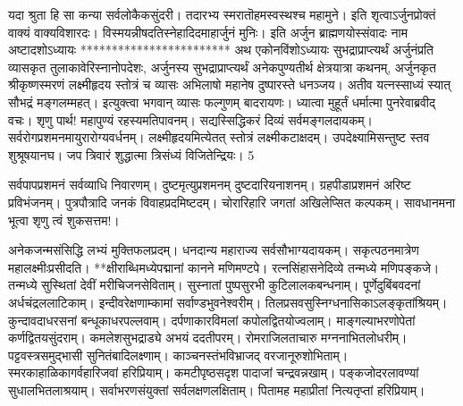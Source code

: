यदा श्रुता हि सा कन्या सर्वलोकैकसुंदरी।
तदारभ्य स्मरातॊहमस्वस्थश्च महामुने।
इति शृत्वाऽर्जुनप्रोक्तं वाक्यं वाक्यविशारदः।
विस्मयन्नीषदतिस्नेहादिदमाहार्जुनं मुनिः।
इति अर्जुन ब्राह्मणयोस्संवादः नाम
अष्टादशोऽध्यायः
************************
अथ एकोनविंशोऽध्यायः सुभद्राप्राप्त्यर्थं अर्जुनंप्रति व्यासकृत तुलाकावेरिस्नानोपदेशः, अर्जुनस्य सुभद्राप्राप्त्यर्थं अनेकपुण्यतीर्थ क्षेत्रयात्रा कथनम्, अर्जुनकृत
श्रीकृष्णस्मरणं लक्ष्मीहृदय स्तोत्रं च
व्यासः
अभिलाषो महानेष दुष्पारस्ते धनञ्जय।
अतीव यत्नस्साध्यं स्यात् सौभद्रं मङ्गलम्महत्।
इत्युक्त्वा भगवान् व्यासः फल्गुणम् बादरायणः।
ध्यात्वा मुहूर्तं धर्मात्मा पुनरेवाब्रवीद् वचः।
शृणु पार्थ! महापुण्यं रहस्यमतिपावनम्।
सद्यस्सिद्धिकरं दिव्यं सर्वमङ्गलदायकम्।
सर्वरोगप्रशमनमायुरारोग्यवर्धनम्।
लक्ष्मीहृदयमित्येतत् स्तोत्रं लक्ष्मीकटाक्षदम्।
उपदेक्ष्यामिसन्तुष्ट स्तव शुश्रूषयानघ।
जप त्रिवारं शुद्धात्मा त्रिसंध्यं विजितेन्द्रियः।
5

सर्वपापप्रशमनं सर्वव्याधि निवारणम्।
दुष्टमृत्युप्रशमनम् दुष्टदारियनाशनम्।
ग्रहपीडाप्रशमनं अरिष्ट प्रविभंजनम्।
पुत्रपौत्रादि जनकं विवाहप्रदमिष्टदम्।
चोरारिहारि जगतां अखिलेप्सित कल्पकम्।
सावधानमना भूत्वा शृणु त्वं शुकसत्तम!।

अनेकजन्मसंसिद्धि लभ्यं मुक्तिफलप्रदम्।
धनदान्य महाराज्य सर्वसौभाग्यदायकम्।
सकृत्पठनमात्रेण महालक्ष्मीःप्रसीदति।
**क्षीराब्धिमध्येपद्मानां कानने मणिमण्टपे।
रत्नसिंहासनेदिव्ये तन्मध्ये मणिपङ्कजे।
तन्मध्ये सुस्थितां देवीं मरीचिजनसेविताम्।
सुस्नातां पुष्पसुरभी कुटिलालकबन्धनाम्।
पूर्णेदुबिंबवदनां अर्धचंद्रललाटिकाम्।
इन्दीवरेक्षणाम्कामां सर्वाण्डभुवनेश्वरीम्।
तिलप्रसवसुस्निग्धनासिकाऽलङ्कृतांश्रियम्।
कुन्दावदाधरसनां बन्धूकाधरपल्लवाम्।
दर्पणाकारविमलां कपोलद्वितयोज्वलाम्।
माङ्गल्याभरणोपेतां कर्णद्वितयसुंदराम्।
कमलेशसुभद्राड्ये अभयं ददतीपरम्।
रोमराजिलताचारु मग्ननाभितलोधरीम्।
पट्टवस्त्रसमुद्भासी सुनितंबादिलक्ष्णाम्।
काञ्चनस्तंभविभ्राजद् वरजानूरुशोभिताम्।
स्मरकाहाळिकागर्वहारिजवां हरिप्रियाम्।
कमटीपृष्ठसदृश पादाजां चन्द्रवन्नखाम्।
पङ्कजोदरलावण्यां सुधालभितलाश्रयाम्।
सर्वाभरणसंयुक्तां सर्वलक्षणलक्षिताम्।
पितामह महाप्रीतां नित्यतृप्तां हरिप्रियाम्।


